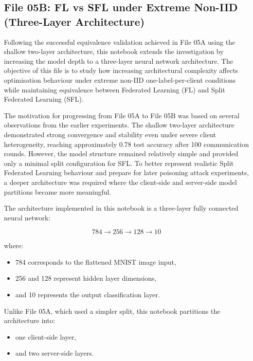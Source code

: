 \subsection*{File 05B: FL vs SFL under Extreme Non-IID (Three-Layer Architecture)}

Following the successful equivalence validation achieved in File 05A using the shallow two-layer architecture, this notebook extends the investigation by increasing the model depth to a three-layer neural network architecture. The objective of this file is to study how increasing architectural complexity affects optimisation behaviour under extreme non-IID one-label-per-client conditions while maintaining equivalence between Federated Learning (FL) and Split Federated Learning (SFL).

The motivation for progressing from File 05A to File 05B was based on several observations from the earlier experiments. The shallow two-layer architecture demonstrated strong convergence and stability even under severe client heterogeneity, reaching approximately 0.78 test accuracy after 100 communication rounds. However, the model structure remained relatively simple and provided only a minimal split configuration for SFL. To better represent realistic Split Federated Learning behaviour and prepare for later poisoning attack experiments, a deeper architecture was required where the client-side and server-side model partitions became more meaningful.

The architecture implemented in this notebook is a three-layer fully connected neural network:

\[
784 \rightarrow 256 \rightarrow 128 \rightarrow 10
\]

where:
\begin{itemize}
    \item 784 corresponds to the flattened MNIST image input,
    \item 256 and 128 represent hidden layer dimensions,
    \item and 10 represents the output classification layer.
\end{itemize}

Unlike File 05A, which used a simpler split, this notebook partitions the architecture into:
\begin{itemize}
    \item one client-side layer,
    \item and two server-side layers.
\end{itemize}

